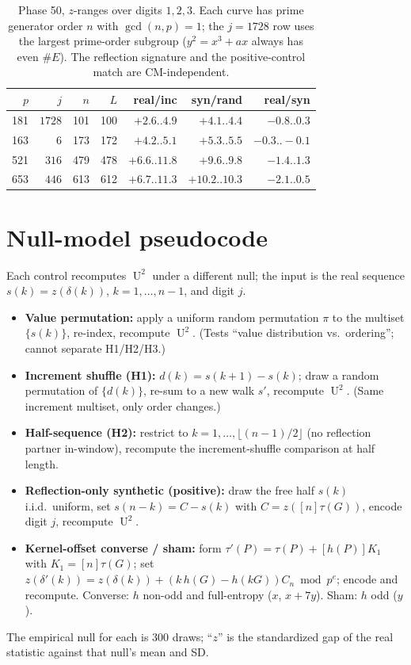 \documentclass[11pt]{article}
\theoremstyle{definition}
\DeclareMathOperator{\Uk}{U}
\begin{document}
\begin{table}[h]
\centering\small
\begin{tabular}{rrrrrrr}
\toprule
$p$ & $j$ & $n$ & $L$ & real/inc & syn/rand & real/syn\\
\midrule
181 & $1728$ & 101 & 100 & $+2.6..4.9$ & $+4.1..4.4$ & $-0.8..0.3$\\
163 & $6$    & 173 & 172 & $+4.2..5.1$ & $+5.3..5.5$ & $-0.3..-0.1$\\
521 & $316$  & 479 & 478 & $+6.6..11.8$& $+9.6..9.8$ & $-1.4..1.3$\\
653 & $446$  & 613 & 612 & $+6.7..11.3$& $+10.2..10.3$&$-2.1..0.5$\\
\bottomrule
\end{tabular}
\caption{Phase 50, $z$-ranges over digits $1,2,3$. Each curve has prime
generator order $n$ with $\gcd(n,p)=1$; the $j{=}1728$ row uses the
largest prime-order subgroup ($y^2{=}x^3{+}ax$ always has even $\#E$).
The reflection signature and the positive-control match are
CM-independent.}
\label{tab:p50}
\end{table}

\section{Null-model pseudocode}\label{app:pseudo}
Each control recomputes $\Uk^2$ under a different null; the input is the
real sequence $s(k)=z(\delta(k))$, $k=1,\dots,n-1$, and digit $j$.
\begin{itemize}
\item \textbf{Value permutation:} apply a uniform random permutation
$\pi$ to the multiset $\{s(k)\}$, re-index, recompute $\Uk^2$. (Tests
``value distribution vs.\ ordering''; cannot separate H1/H2/H3.)
\item \textbf{Increment shuffle (H1):} $d(k)=s(k{+}1)-s(k)$; draw a random
permutation of $\{d(k)\}$, re-sum to a new walk $s'$, recompute $\Uk^2$.
(Same increment multiset, only order changes.)
\item \textbf{Half-sequence (H2):} restrict to $k=1,\dots,\lfloor(n-1)/2\rfloor$
(no reflection partner in-window), recompute the increment-shuffle
comparison at half length.
\item \textbf{Reflection-only synthetic (positive):} draw the free half
$s(k)$ i.i.d.\ uniform, set $s(n{-}k)=C-s(k)$ with $C=z([n]\tau(G))$,
encode digit $j$, recompute $\Uk^2$.
\item \textbf{Kernel-offset converse / sham:} form $\tau'(P)=\tau(P)+[h(P)]K_1$
with $K_1=[n]\tau(G)$; set $z(\delta'(k))=z(\delta(k))+(k\,h(G)-h(kG))C_n
\bmod p^e$; encode and recompute. Converse: $h$ non-odd and full-entropy
($x$, $x{+}7y$). Sham: $h$ odd ($y$).
\end{itemize}
The empirical null for each is $300$ draws; ``$z$'' is the standardized
gap of the real statistic against that null's mean and SD.
\end{document}
